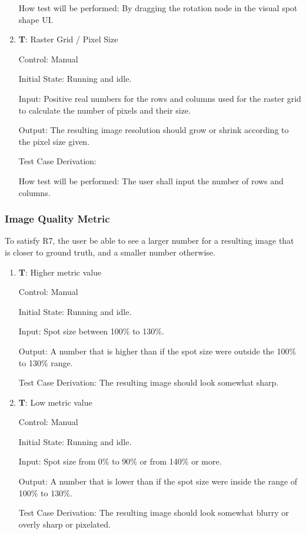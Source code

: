 \documentclass[12pt, titlepage]{article}
\newcounter{testnum} %
\begin{document}
\begin{enumerate}
    How test will be performed: By dragging the rotation node in the visual spot shape UI.
					
    \item{\textbf{T\thetestnum \label{T_rasterGrid}}: Raster Grid / Pixel Size\\}

    Control: Manual
                
    Initial State: Running and idle.
              
    Input: Positive real numbers for the rows and columns used for the raster grid to calculate the number of pixels and their size.
              
    Output: The resulting image resolution should grow or shrink according to the pixel size given.

    Test Case Derivation: 

    How test will be performed: The user shall input the number of rows and columns.

\end{enumerate}


\subsubsection{Image Quality Metric}

To satisfy R7, the user be able to see a larger number for a resulting image that is closer to ground truth, 
and a smaller number otherwise.

\begin{enumerate}

  \item{\textbf{T\thetestnum \label{T_manualMetricHigh}}: Higher metric value\\}

    Control: Manual
              
    Initial State: Running and idle.
              
    Input: Spot size between 100\% to 130\%.
              
    Output: A number that is higher than if the spot size were outside the 100\% to 130\% range.

    Test Case Derivation: The resulting image should look somewhat sharp.
					
  \item{\textbf{T\thetestnum \label{T_manualMetricLow}}: Low metric value\\}

  Control: Manual
              
  Initial State: Running and idle.
            
  Input: Spot size from 0\% to 90\% or from 140\% or more.
            
  Output: A number that is lower than if the spot size were inside the range of 100\% to 130\%.

  Test Case Derivation: The resulting image should look somewhat blurry or overly sharp or pixelated.

\end{enumerate}
\end{document}
